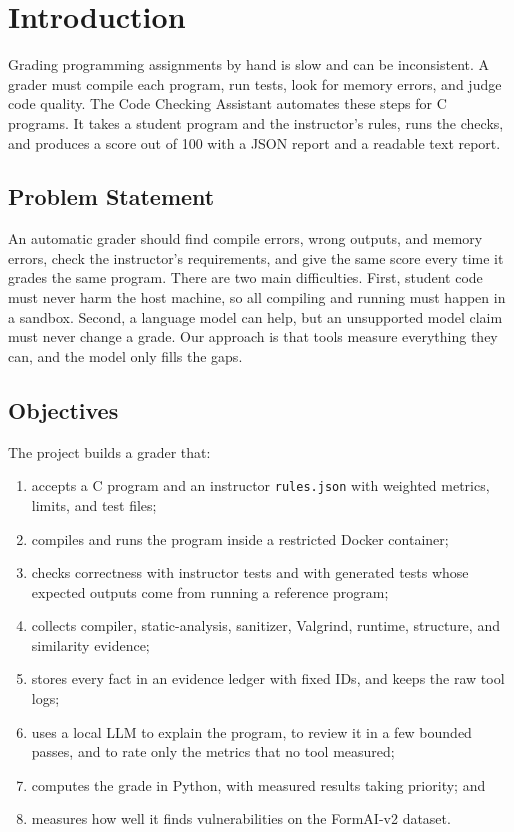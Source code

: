 \documentclass[conference]{IEEEtran}
\begin{document}
\section{Introduction}
Grading programming assignments by hand is slow and can be inconsistent. A
grader must compile each program, run tests, look for memory errors, and judge
code quality. The Code Checking Assistant automates these steps for C programs.
It takes a student program and the instructor's rules, runs the checks, and
produces a score out of 100 with a JSON report and a readable text report.

\subsection{Problem Statement}
An automatic grader should find compile errors, wrong outputs, and memory
errors, check the instructor's requirements, and give the same score every time
it grades the same program. There are two main difficulties. First, student code must never harm the host
machine, so all compiling and running must happen in a sandbox. Second, a
language model can help, but an unsupported model claim must never change a
grade. Our approach is that tools measure everything they can, and the model only
fills the gaps.

\subsection{Objectives}
The project builds a grader that:
\begin{enumerate}
  \item accepts a C program and an instructor \texttt{rules.json} with weighted
        metrics, limits, and test files;
  \item compiles and runs the program inside a restricted Docker container;
  \item checks correctness with instructor tests and with generated tests whose
        expected outputs come from running a reference program;
  \item collects compiler, static-analysis, sanitizer, Valgrind, runtime,
        structure, and similarity evidence;
  \item stores every fact in an evidence ledger with fixed IDs, and keeps the raw
        tool logs;
  \item uses a local LLM to explain the program, to review it in a few bounded
        passes, and to rate only the metrics that no tool measured;
  \item computes the grade in Python, with measured results taking priority;
        and
  \item measures how well it finds vulnerabilities on the FormAI-v2 dataset.
\end{enumerate}
\end{document}
